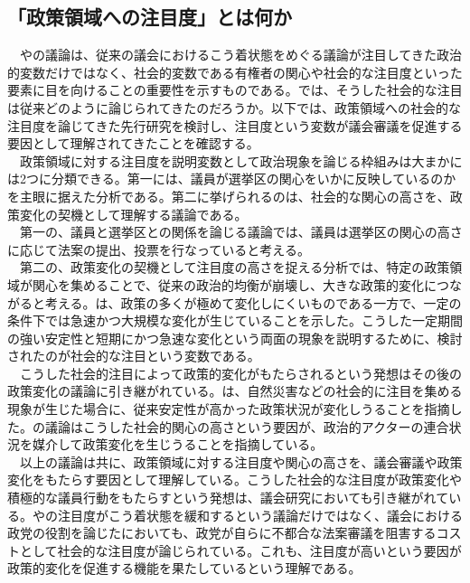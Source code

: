 \documentclass[here]{article}
\begin{document}
\subsection{「政策領域への注目度」とは何か}
　\citet*{Binder2003-bn}や\citet*{Adler2013-ay}の議論は、従来の議会におけるこう着状態をめぐる議論が注目してきた政治的変数だけではなく、社会的変数である有権者の関心や社会的な注目度といった要素に目を向けることの重要性を示すものである。では、そうした社会的な注目は従来どのように論じられてきたのだろうか。以下では、政策領域への社会的な注目度を論じてきた先行研究を検討し、注目度という変数が議会審議を促進する要因として理解されてきたことを確認する。\\
　政策領域に対する注目度を説明変数として政治現象を論じる枠組みは大まかには2つに分類できる。第一には、議員が選挙区の関心をいかに反映しているのかを主眼に据えた分析である。第二に挙げられるのは、社会的な関心の高さを、政策変化の契機として理解する議論である。\\
　第一の、議員と選挙区との関係を論じる議論では、議員は選挙区の関心の高さに応じて法案の提出、投票を行なっていると考える。\\
　第二の、政策変化の契機として注目度の高さを捉える分析では、特定の政策領域が関心を集めることで、従来の政治的均衡が崩壊し、大きな政策的変化につながると考える。\citep*{Baumgartner2015-ee,John2018-im}\citet*{Baumgartner1993-bc,Baumgartner2015-ee}は、政策の多くが極めて変化しにくいものである一方で、一定の条件下では急速かつ大規模な変化が生じていることを示した。こうした一定期間の強い安定性と短期にかつ急速な変化という両面の現象を説明するために、検討されたのが社会的な注目という変数である。\\
　こうした社会的注目によって政策的変化がもたらされるという発想はその後の政策変化の議論に引き継がれている。\citet*{Birkland1997-lq,Birkland1998-xp}は、自然災害などの社会的に注目を集める現象が生じた場合に、従来安定性が高かった政策状況が変化しうることを指摘した。\citet*{Sabatier1993-id}の議論はこうした社会的関心の高さという要因が、政治的アクターの連合状況を媒介して政策変化を生じうることを指摘している。\\
　以上の議論は共に、政策領域に対する注目度や関心の高さを、議会審議や政策変化をもたらす要因として理解している。こうした社会的な注目度が政策変化や積極的な議員行動をもたらすという発想は、議会研究においても引き継がれている。\citet*{Binder2017-wr}や\citet*{Adler2013-ay}の注目度がこう着状態を緩和するという議論だけではなく、議会における政党の役割を論じた\citet*[Ch.6]{Cox2005-pn}においても、政党が自らに不都合な法案審議を阻害するコストとして社会的な注目度が論じられている。これも、注目度が高いという要因が政策的変化を促進する機能を果たしているという理解である。\\
\end{document}
